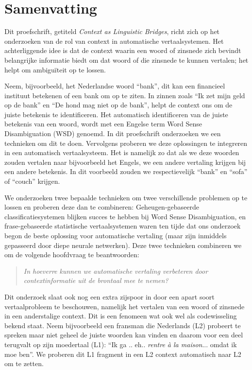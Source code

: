 \chapter*{Samenvatting}

Dit proefschrift, getiteld \emph{Context as Linguistic Bridges}, richt zich op het onderzoeken van de rol van context in
automatische vertaalsystemen. Het achterliggende idee is dat de context waarin een woord of zinsnede zich bevindt
belangrijke informatie biedt om dat woord of die zinsnede te kunnen vertalen; het helpt om ambiguïteit op te lossen.

Neem, bijvoorbeeld, het Nederlandse woord ``bank'', dit kan een financieel instituut betekenen of een bank om op te
ziten. In zinnen zoals ``Ik zet mijn geld op de bank'' en ``De hond mag niet op de bank'', helpt de context ons om de
juiste betekenis te identificeren. Het automatisch identificeren van de juiste betekenis van een woord, wordt met een
Engelse term  Word Sense Disambiguation (WSD) genoemd. In dit proefschrift onderzoeken we een technieken om dit te doen.
Vervolgens proberen we deze oplossingen te integreren in een automatisch vertaalsysteem. Het is namelijk zo dat als we
deze woorden zouden vertalen naar bijvoorbeeld het Engels, we een andere vertaling krijgen bij een andere betekenis. In
dit voorbeeld zouden we respectievelijk ``bank'' en ``sofa'' of ``couch'' krijgen.

We onderzoeken twee bepaalde technieken om twee verschillende problemen op te lossen en proberen deze dan te
combineren: Geheugen-gebaseerde classificatiesystemen blijken succes te hebben bij Word Sense Disambiguation, en
frase-gebaseerde statistische vertaalsystemen waren ten tijde dat ons onderzoek begon de beste oplossing voor
automatische vertaling (maar zijn inmiddels gepasseerd door diepe neurale netwerken). Deze twee technieken combineren we
om de volgende hoofdvraag te beantwoorden:

\begin{quote}
\emph{In hoeverre kunnen we automatische vertaling verbeteren door contextinformatie uit de brontaal mee te nemen?}
\end{quote}

Dit onderzoek slaat ook nog een extra zijspoor in door een apart soort vertaalprobleem te beschouwen, namelijk het vertalen
van een woord of zinsnede in een anderstalige context. Dit is een fenomeen wat ook wel als codewisseling bekend staat. Neem
bijvoorbeeld een fransman die Nederlands (L2) probeert te spreken maar niet geheel de juiste woorden kan vinden en
daarom voor een deel terugvalt op zijn moedertaal (L1): ``Ik ga .. eh.. \emph{rentre à la maison}... omdat ik moe ben''.
We proberen dit L1 fragment in een L2 context automatisch naar L2 om te zetten.

